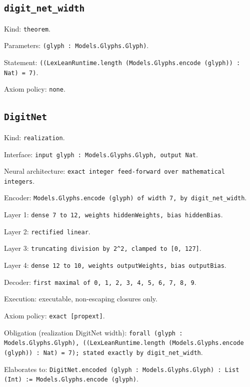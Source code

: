 \documentclass[11pt]{article}
\begin{document}
\subsection*{\texttt{digit\_net\_width}}
\noindent Kind: \texttt{theorem}.\par
\noindent Parameters: \texttt{(glyph : Models.Glyphs.Glyph)}.\par
\noindent Statement: \texttt{((LexLeanRuntime.length (Models.Glyphs.encode (glyph)) : Nat) = 7)}.\par
\noindent Axiom policy: \texttt{none}.\par
\subsection*{\texttt{DigitNet}}
\noindent Kind: \texttt{realization}.\par
\noindent Interface: \texttt{input glyph : Models.Glyphs.Glyph, output Nat}.\par
\noindent Neural architecture: \texttt{exact integer feed-forward over mathematical integers}.\par
\noindent Encoder: \texttt{Models.Glyphs.encode (glyph) of width 7, by digit\_net\_width}.\par
\noindent Layer 1: \texttt{dense 7 to 12, weights hiddenWeights, bias hiddenBias}.\par
\noindent Layer 2: \texttt{rectified linear}.\par
\noindent Layer 3: \texttt{truncating division by 2\^{}2, clamped to [0, 127]}.\par
\noindent Layer 4: \texttt{dense 12 to 10, weights outputWeights, bias outputBias}.\par
\noindent Decoder: \texttt{first maximal of 0, 1, 2, 3, 4, 5, 6, 7, 8, 9}.\par
\noindent Execution: executable, non-escaping closures only.\par
\noindent Axiom policy: \texttt{exact [propext]}.\par
\noindent Obligation (realization DigitNet width): \texttt{forall (glyph : Models.Glyphs.Glyph), ((LexLeanRuntime.length (Models.Glyphs.encode (glyph)) : Nat) = 7); stated exactly by digit\_net\_width}.\par
\noindent Elaborates to: \texttt{DigitNet.encoded (glyph : Models.Glyphs.Glyph) : List (Int) := Models.Glyphs.encode (glyph)}.\par
\end{document}
